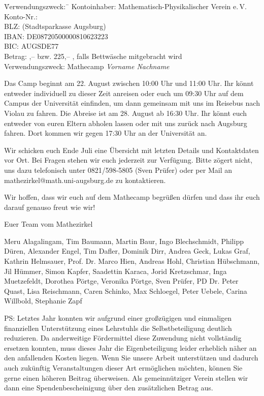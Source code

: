 \documentclass[12pt]{zettel}
\begin{document}
\vspace{-0.7em}
\begin{tabbing}
  \qquad\quad \= Verwendungszweck:\, \= \kill
  \> Kontoinhaber: \> Mathematisch-Physikalischer Verein e.\,V. \\
  \> Konto-Nr.:  \\
  \> BLZ:  (Stadtsparkasse Augsburg) \\
  \> IBAN: \> DE08720500000810623223 \\
  \> BIC: \> AUGSDE77 \\
  \> Betrag: ,-- \texteuro{} bzw. 225,-- \texteuro, falls Bettwäsche
  mitgebracht wird \\
  \> Verwendungszweck: \> Mathecamp \emph{Vorname Nachname}
\end{tabbing}
\vspace{-0.7em}

Das Camp beginnt am 22. August zwischen 10:00 Uhr und 11:00 Uhr. Ihr könnt
entweder individuell zu dieser Zeit anreisen oder euch um 09:30 Uhr auf dem Campus der
Universität einfinden, um dann gemeinsam mit uns im Reisebus nach Violau zu fahren.
Die Abreise ist am 28. August ab 16:30 Uhr. Ihr könnt euch entweder von euren
Eltern abholen lassen oder mit uns zurück nach Augsburg fahren. Dort kommen wir
gegen 17:30 Uhr an der Universität an.

Wir schicken euch Ende Juli eine Übersicht mit
letzten Details und Kontaktdaten vor Ort. Bei Fragen stehen wir euch jederzeit
zur Verfügung. Bitte zögert nicht, uns dazu telefonisch unter 0821/598-5805
(Sven Prüfer) oder per Mail an \textsf{mathezirkel@math.uni-augsburg.de} zu kontaktieren.

Wir hoffen, dass wir
euch auf dem Mathecamp begrüßen dürfen und dass
ihr euch darauf genauso freut wie wir!

\vspace{2em}

Euer Team vom Mathezirkel

{\small Meru Alagalingam, Tim Baumann, Martin Baur, Ingo Blechschmidt, Philipp
Düren, Alexander Engel, Tim Dafler, Dominik Dirr, Andrea Geck, Lukas Graf,
Kathrin Helmsauer, Prof. Dr. Marco Hien, Andreas Hohl, Christian Hübschmann,
Jil Hümmer, Simon Kapfer, Saadettin Karaca, Jorid Kretzschmar, Inga
Muetzefeldt, Dorothea Pörtge, Veronika Pörtge, Sven Prüfer, PD Dr. Peter Quast,
Lisa Reischmann, Caren Schinko, Max Schloegel, Peter Uebele, Carina Willbold,
Stephanie Zapf}

\vfill

PS: Letztes Jahr konnten wir aufgrund einer großzügigen und einmaligen
finanziellen Unterstützung eines Lehrstuhls die Selbstbeteiligung deutlich
reduzieren. Da anderweitige Fördermittel diese Zuwendung nicht vollständig
ersetzen konnten, muss dieses Jahr die Eigenbeteiligung leider erheblich näher
an den anfallenden Kosten
liegen. Wenn Sie unsere Arbeit unterstützen
und dadurch auch zukünftig Veranstaltungen dieser Art ermöglichen möchten,
können Sie gerne einen höheren Beitrag überweisen. Als gemeinnütziger Verein
stellen wir dann eine Spendenbescheinigung über den zusätzlichen
Betrag aus.
\end{document}
